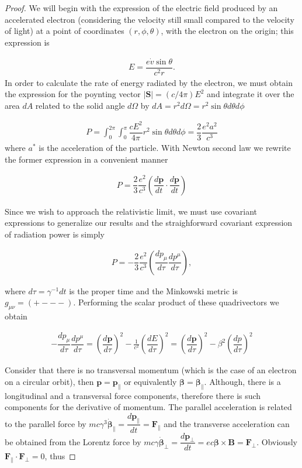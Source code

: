 \begin{proof}
We will begin with the expression of the electric field produced by an accelerated electron (considering the velocity still small compared to the velocity of light) at a point of coordinates $(r,\phi,\theta)$, with the electron on the origin; this expression is

\begin{align*}
E = \dfrac{e\dot{v}\sin \theta}{c^2 r}.
\end{align*}
In order to calculate the rate of energy radiated by the electron, we must obtain the expression for the poynting vector $|\mathbf{S}| = (c/4\pi)E^2$ and integrate it over the area $dA$ related to the solid angle $d\Omega$ by $dA = r^2d\Omega = r^2\sin\theta d\theta d\phi$

\begin{align*}
P = \int_{0}^{2\pi}\int_{0}^{\pi}\dfrac{cE^2}{4\pi}r^2\sin\theta d\theta d\phi = \dfrac{2}{3}\dfrac{e^2a^{2}}{c^3}
\end{align*}
where $a^{*}$ is the acceleration of the particle. With Newton second law we rewrite the former expression in a convenient manner

\begin{align*}
P = \dfrac{2}{3}\dfrac{e^2}{c^3} \left(\dfrac{d\mathbf{p}}{dt}\cdot\dfrac{d\mathbf{p}}{dt}\right)
\end{align*}

Since we wish to approach the relativistic limit, we must use covariant expressions to generalize our results and the straighforward covariant expression of radiation power is simply

\begin{align*}
P = -\dfrac{2}{3}\dfrac{e^2}{c^3} \left(\dfrac{d{p_\mu}}{d\tau}\dfrac{dp^\mu}{d\tau}\right),
\end{align*}

where $d\tau = \gamma^{-1}dt$ is the proper time and the Minkowski metric is $g_{\mu \nu} = (+ - - -)$. Performing the scalar product of these quadrivectors we obtain

\begin{align*}
-\dfrac{d{p_\mu}}{d\tau}\dfrac{dp^\mu}{d\tau} = \left(\dfrac{d\mathbf{p}}{d\tau}\right)^2 - \frac{1}{c^2}\left(\dfrac{dE}{d\tau}\right)^2 = \left(\dfrac{d\mathbf{p}}{d\tau}\right)^2 - \beta^2\left(\dfrac{dp}{d\tau}\right)^2
\end{align*}

Consider that there is no transversal momentum (which is the case of an electron on a circular orbit), then $\boldsymbol{{p}} = \boldsymbol{p}_\parallel$ or equivalently $\boldsymbol{\beta} = \boldsymbol{\beta_\parallel}$. Although, there is a longitudinal and a transversal force components, therefore
 there is such components for the derivative of momentum. The parallel acceleration is related to the parallel force by $mc\gamma^3\boldsymbol{\dot{\beta}}_\parallel = \dfrac{d\mathbf{p}_\parallel}{dt} = \mathbf{F}_\parallel$ and the transverse acceleration can be obtained from the Lorentz force by
 $mc \gamma\boldsymbol{\dot{\beta}}_\perp = \dfrac{d\boldsymbol{p}_{\perp}}{dt} = ec\boldsymbol{{\beta}} \times \mathbf{B} = \mathbf{F}_\perp$. Obviously $\mathbf{F}_\parallel \cdot \mathbf{F}_\perp = 0$, thus


\end{proof}
